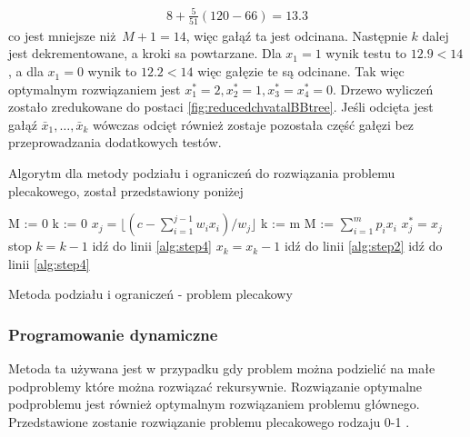 \begin{equation*}
  \begin{aligned}
    8+\frac{5}{51}(120-66) = 13.3
  \end{aligned}
\end{equation*}
co jest mniejsze niż $M+1 =14$, więc gałąź ta jest odcinana. Następnie $k$ dalej jest dekrementowane, a kroki sa powtarzane. Dla $x_1=1$ wynik testu to $12.9 < 14$, a dla $x_1=0$ wynik to $12.2 < 14$ więc gałęzie te są odcinane. Tak więc optymalnym rozwiązaniem jest  $x_1^* = 2, x_2^*=1, x_3^*=x_4^*=0$. Drzewo wyliczeń zostało zredukowane do postaci \ref{fig:reducedchvatalBBtree}.
Jeśli odcięta jest gałąź $\bar{x}_1, \dots, \bar{x}_k$ wówczas odcięt również zostaje pozostała część gałęzi bez przeprowadzania dodatkowych testów.

Algorytm dla metody podziału i ograniczeń do rozwiązania problemu plecakowego, został przedstawiony poniżej

\begin{algorithm}
  \begin{algorithmic}[1]
    \State M := 0
    \State k := 0
     \label{alg:step2}
      \State $ x_j = \lfloor{(c - \sum_{i=1}^{j-1}w_ix_i)/w_j}\rfloor$
    \EndFor
    \State k := m
      \State M := $\sum_{i=1}^m p_ix_i$
        \State $x_j^* = x_j$
      \EndFor
    \EndIf
     \label{alg:step4}
      \State stop
    \Else
      \State $k=k-1$
    \EndIf
      \State idź do linii \ref{alg:step4}
    \Else
      \State $x_k = x_k - 1$
    \EndIf
      \State idź do linii \ref{alg:step2}
    \Else
      \State idź do linii \ref{alg:step4}
    \EndIf
  \end{algorithmic}
    \caption{Metoda podziału i ograniczeń - problem plecakowy}
\end{algorithm}

\subsubsection{Programowanie dynamiczne}
Metoda ta używana jest w przypadku gdy problem można podzielić na małe podproblemy które można rozwiązać rekursywnie. Rozwiązanie optymalne podproblemu jest również optymalnym rozwiązaniem problemu głównego. Przedstawione zostanie rozwiązanie problemu plecakowego rodzaju 0-1 \cite{GoddardLecture}.

